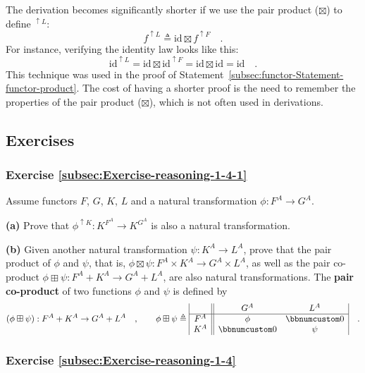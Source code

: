 The derivation becomes significantly shorter if we use the pair product
($\boxtimes$) to define $^{\uparrow L}$:
\[
f^{\uparrow L}\triangleq\text{id}\boxtimes f^{\uparrow F}\quad.
\]
For instance, verifying the identity law looks like this:
\[
\text{id}^{\uparrow L}=\text{id}\boxtimes\text{id}^{\uparrow F}=\text{id}\boxtimes\text{id}=\text{id}\quad.
\]
This technique was used in the proof of Statement~\ref{subsec:functor-Statement-functor-product}.
The cost of having a shorter proof is the need to remember the properties
of the pair product ($\boxtimes$), which is not often used in derivations.

\subsection{Exercises}

\subsubsection{Exercise \label{subsec:Exercise-reasoning-1-4-1}\ref{subsec:Exercise-reasoning-1-4-1}}

Assume functors $F$, $G$, $K$, $L$ and a natural transformation
$\phi:F^{A}\rightarrow G^{A}$.

\textbf{(a)} Prove that $\phi^{\uparrow K}:K^{F^{A}}\rightarrow K^{G^{A}}$
is also a natural transformation.

\textbf{(b)} Given another natural transformation $\psi:K^{A}\rightarrow L^{A}$,
prove that the pair product of $\phi$ and $\psi$, that is, $\phi\boxtimes\psi:F^{A}\times K^{A}\rightarrow G^{A}\times L^{A}$,
as well as the pair co-product $\phi\boxplus\psi:F^{A}+K^{A}\rightarrow G^{A}+L^{A}$,
are also natural transformations. The \textbf{pair co-product}
of two functions $\phi$ and $\psi$ is defined by
\[
(\phi\boxplus\psi):F^{A}+K^{A}\rightarrow G^{A}+L^{A}\quad,\quad\quad\phi\boxplus\psi\triangleq\begin{array}{|c||cc|}
 & G^{A} & L^{A}\\
\hline F^{A} & \phi & \bbnum 0\\
K^{A} & \bbnum 0 & \psi
\end{array}\quad.
\]


\subsubsection{Exercise \label{subsec:Exercise-reasoning-1-4}\ref{subsec:Exercise-reasoning-1-4}}

